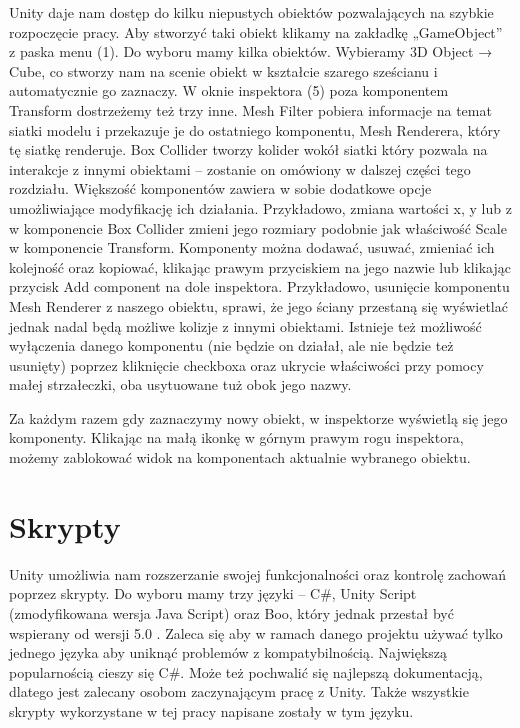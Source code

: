 \documentclass[12pt]{xmgr}
\begin{document}
Unity daje nam dostęp do kilku niepustych obiektów pozwalających na szybkie rozpoczęcie pracy. Aby stworzyć taki obiekt klikamy na zakładkę „GameObject” z paska menu (1). Do wyboru mamy kilka obiektów. Wybieramy 3D Object → Cube, co stworzy nam na scenie obiekt w kształcie szarego sześcianu i automatycznie go zaznaczy. W oknie inspektora (5) poza komponentem Transform dostrzeżemy też trzy inne. Mesh Filter pobiera informacje na temat siatki modelu i przekazuje je do ostatniego komponentu, Mesh Renderera, który tę siatkę renderuje. Box Collider tworzy kolider wokół siatki który pozwala na interakcje z innymi obiektami – zostanie on omówiony w dalszej części tego rozdziału. Większość komponentów zawiera w sobie dodatkowe opcje umożliwiające modyfikację ich działania. Przykładowo, zmiana wartości x, y  lub z w komponencie Box Collider zmieni jego rozmiary podobnie jak właściwość Scale w komponencie Transform. Komponenty można dodawać, usuwać, zmieniać ich kolejność oraz kopiować, klikając prawym przyciskiem na jego nazwie lub klikając przycisk Add component na dole inspektora. Przykładowo, usunięcie komponentu Mesh Renderer z naszego obiektu, sprawi, że jego ściany przestaną się wyświetlać jednak nadal będą możliwe kolizje z innymi obiektami.
Istnieje też możliwość wyłączenia danego komponentu (nie będzie on działał, ale nie będzie też usunięty) poprzez kliknięcie checkboxa  oraz ukrycie właściwości przy pomocy małej strzałeczki, oba usytuowane tuż obok jego nazwy.

Za każdym razem gdy zaznaczymy nowy obiekt, w inspektorze wyświetlą się jego komponenty. Klikając na małą ikonkę w górnym prawym rogu inspektora, możemy zablokować widok na komponentach aktualnie wybranego obiektu.

\section{Skrypty}

Unity umożliwia nam rozszerzanie swojej funkcjonalności oraz kontrolę zachowań poprzez skrypty. Do wyboru mamy trzy języki – C\#, Unity Script (zmodyfikowana wersja Java Script) oraz Boo, który jednak przestał być wspierany od wersji 5.0 . Zaleca się aby w ramach danego projektu używać tylko jednego języka aby uniknąć problemów z kompatybilnością.
Największą popularnością cieszy się C\#. Może też pochwalić się najlepszą dokumentacją, dlatego jest zalecany osobom zaczynającym pracę z Unity. Także wszystkie skrypty wykorzystane w tej pracy napisane zostały w tym języku.
\end{document}
